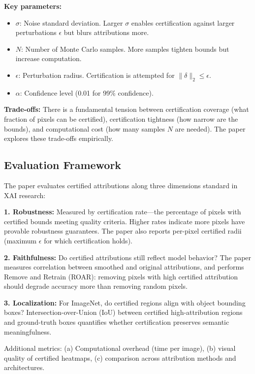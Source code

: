 \documentclass[11pt]{article}
\begin{document}
\textbf{Key parameters:}
\begin{itemize}
    \item $\sigma$: Noise standard deviation. Larger $\sigma$ enables certification against larger perturbations $\epsilon$ but blurs attributions more.
    \item $N$: Number of Monte Carlo samples. More samples tighten bounds but increase computation.
    \item $\epsilon$: Perturbation radius. Certification is attempted for $\|\delta\|_2 \leq \epsilon$.
    \item $\alpha$: Confidence level (0.01 for 99\% confidence).
\end{itemize}

\textbf{Trade-offs:} There is a fundamental tension between certification coverage (what fraction of pixels can be certified), certification tightness (how narrow are the bounds), and computational cost (how many samples $N$ are needed). The paper explores these trade-offs empirically.

\subsection{Evaluation Framework}

The paper evaluates certified attributions along three dimensions standard in XAI research:

\textbf{1. Robustness:} Measured by certification rate—the percentage of pixels with certified bounds meeting quality criteria. Higher rates indicate more pixels have provable robustness guarantees. The paper also reports per-pixel certified radii (maximum $\epsilon$ for which certification holds).

\textbf{2. Faithfulness:} Do certified attributions still reflect model behavior? The paper measures correlation between smoothed and original attributions, and performs Remove and Retrain (ROAR): removing pixels with high certified attribution should degrade accuracy more than removing random pixels.

\textbf{3. Localization:} For ImageNet, do certified regions align with object bounding boxes? Intersection-over-Union (IoU) between certified high-attribution regions and ground-truth boxes quantifies whether certification preserves semantic meaningfulness.

Additional metrics: (a) Computational overhead (time per image), (b) visual quality of certified heatmaps, (c) comparison across attribution methods and architectures.
\end{document}
